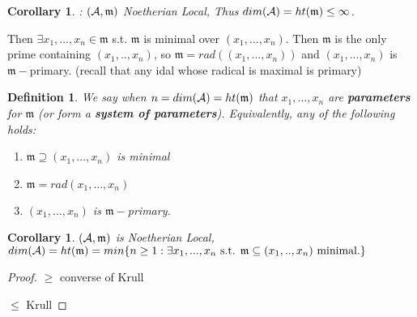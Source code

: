\documentclass[11pt]{article}
\newtheorem{cor}[thm]{Corollary}
\newtheorem{dfn}[thm]{Definition}
\newcommand{\scm}{{\mathfrak m}}
\newcommand{\cala}{{\cal A}}
\begin{document}
\begin{cor}: $(\cala,\scm)$ Noetherian Local, Thus $dim(\cala)=ht(\scm)\leq \infty$.
\end{cor}
Then $\exists x_1,...,x_n\in\scm$ s.t. $\scm$ is minimal over $(x_1,...,x_n)$. Then $\scm$ is the only prime containing $(x_1,..,x_n)$, so $\scm=rad((x_1,...,x_n))$ and $(x_1,...,x_n)$ is $\scm-$primary. (recall that any idal whose radical is maximal is primary)

\begin{dfn}
We say when $n=dim(\cala)=ht(\scm)$ that $x_1,...,x_n$ are \textbf{parameters} for $\scm$ (or form a \textbf{system of parameters}). Equivalently, any of the following holds:
\begin{enumerate}[label=(\roman*)]
\item $\scm\supseteq (x_1,...,x_n)$ is minimal
\item $\scm=rad(x_1,...,x_n)$
\item $(x_1,...,x_n)$ is $\scm-$primary.
\end{enumerate}
\end{dfn}

\begin{cor}
$(\cala,\scm)$ is Noetherian Local, $dim(\cala)=ht(\scm)=min\{n\geq 1:\exists x_1,...,x_n\text{ s.t. }\scm\subseteq (x_1,..,x_n)\text{ minimal.}\}$
\end{cor}
\begin{proof}
$\geq$ converse of Krull

$\leq $ Krull
\end{proof}
\end{document}
